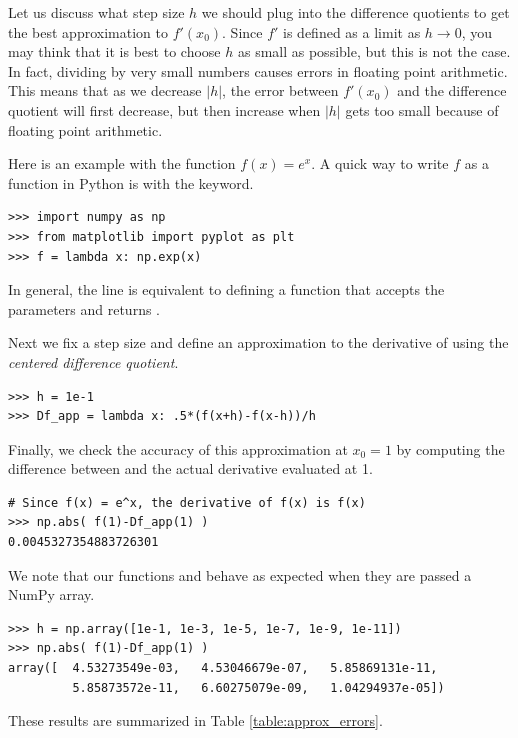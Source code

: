Let us discuss what step size $h$ we should plug into the difference quotients to get the best approximation to $f'(x_0)$.
Since $f'$ is defined as a limit as $h \rightarrow 0$, you may think that it is best to choose $h$ as small as possible, but this is not the case.
In fact, dividing by very small numbers causes errors in floating point arithmetic.
This means that as we decrease $|h|$, the error between $f'(x_0)$ and the difference quotient will first decrease, but then increase when $|h|$ gets too small because of floating point arithmetic.

Here is an example with the function $f(x) = e^x$. A quick way to write $f$ as a function in Python is with the  keyword.

\begin{lstlisting}
>>> import numpy as np
>>> from matplotlib import pyplot as plt
>>> f = lambda x: np.exp(x)
\end{lstlisting}

In general, the line  is equivalent to defining a function  that accepts the parameters  and returns .

Next we fix a step size  and define an approximation to the derivative of  using the \emph{centered difference quotient}.

\begin{lstlisting}
>>> h = 1e-1
>>> Df_app = lambda x: .5*(f(x+h)-f(x-h))/h
\end{lstlisting}

Finally, we check the accuracy of this approximation at $x_0=1$ by computing the difference between  and the actual derivative evaluated at 1.

\begin{lstlisting}
# Since f(x) = e^x, the derivative of f(x) is f(x)
>>> np.abs( f(1)-Df_app(1) )
0.0045327354883726301
\end{lstlisting}

We note that our functions  and  behave as expected when they are passed a NumPy array.

\begin{lstlisting}
>>> h = np.array([1e-1, 1e-3, 1e-5, 1e-7, 1e-9, 1e-11])
>>> np.abs( f(1)-Df_app(1) )
array([  4.53273549e-03,   4.53046679e-07,   5.85869131e-11,
         5.85873572e-11,   6.60275079e-09,   1.04294937e-05])
\end{lstlisting}

These results are summarized in Table \ref{table:approx_errors}.

